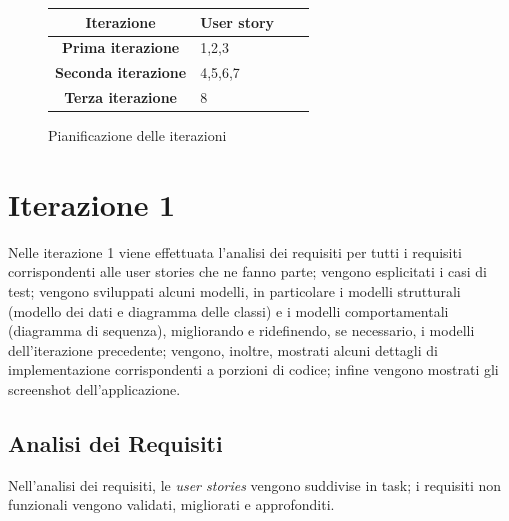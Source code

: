 \renewcommand{\arraystretch}{1.5}
\begin{figure}[h!]
\begin{center}

\begin{tabular}[c]{|c|p{10cm}|c|c|}
\hline
Iterazione & User story\\ \hline
\textbf{Prima iterazione} & 1,2,3 \\ \hline
\textbf{Seconda iterazione} & 4,5,6,7\\ \hline
\textbf{Terza iterazione} & 8\\ \hline
\end{tabular}
\caption{Pianificazione delle iterazioni\label{pianificazioneiterazioni}}

\end{center}
\end{figure}


\clearpage

\section{Iterazione 1}
Nelle iterazione 1 viene effettuata l'analisi dei requisiti per tutti i requisiti corrispondenti alle user stories che ne fanno parte; vengono esplicitati i casi di test; vengono sviluppati alcuni modelli, in particolare i modelli strutturali (modello dei dati e diagramma delle classi) e i modelli comportamentali (diagramma di sequenza), migliorando e ridefinendo, se necessario, i modelli dell'iterazione precedente; vengono, inoltre, mostrati alcuni dettagli di implementazione corrispondenti a porzioni di codice; infine vengono mostrati gli screenshot dell'applicazione.\\

\subsection{Analisi dei Requisiti}
Nell'analisi dei requisiti, le \textit{user stories} vengono suddivise in task; i requisiti non funzionali vengono validati, migliorati e approfonditi.

